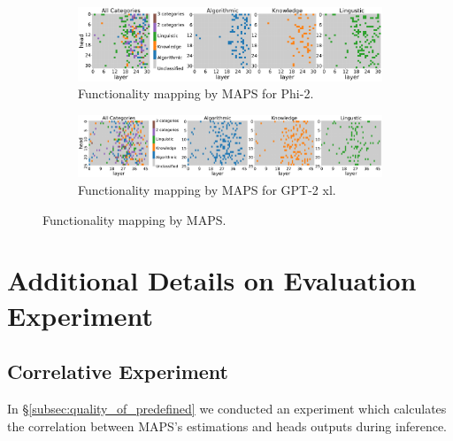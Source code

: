 \documentclass[11pt]{article}
\newcommand{\PHI}{Phi-2}
\newcommand{\GPTxl}{GPT-2 xl}
\newcommand{\framework}{\textsc{MAPS}}
\begin{document}
\begin{figure}[htbp]
    \begin{subfigure}{\textwidth}
    \includegraphics[width=\textwidth]
    {figures/classified_heads/phi-2_threshold_0.15}
    \caption{Functionality mapping by \framework{} for \PHI{}.}
    \label{fig:all_classified_heads_phi-2_appendix}
    \end{subfigure}

    \begin{subfigure}{\textwidth}
    \includegraphics[width=\textwidth]
    {figures/classified_heads/gpt2-xl_threshold_0.15}
    \caption{Functionality mapping by \framework{} for \GPTxl{}.}
    \label{fig:all_classified_heads_gpt2-xl_appendix}
    \end{subfigure}
     
    \caption{Functionality mapping  by \framework{}.}
    \label{fig:all_classified_heads_appendix}
\end{figure}



\section{Additional Details on Evaluation Experiment}

\subsection{Correlative Experiment}
\label{appendix:dynamic_validation_extended}
In \S\ref{subsec:quality_of_predefined} we conducted an experiment which calculates the correlation between \framework{}'s estimations and heads outputs during inference.
\end{document}
